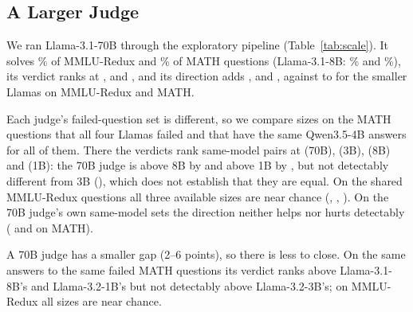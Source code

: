\documentclass[11pt]{article}
\newcounter{takeaway}
\begin{document}
\subsection{A Larger Judge}
\label{sec:scale}

\begin{table}[t]
\centering
\small

\caption{Llama judges by size, main answer pools (exploratory protocol). Solves: share of the pool's questions the judge answers correctly (\%). Verdict: the verdict's ranking. Gap: best layer's direction ranking minus the verdict's. Same model: the verdict's ranking on same-model pairs (Qwen3.5-4B answers) on questions the judge failed; Llama-3.2-3B has no MMLU-Redux same-model run.}
\label{tab:scale}
\end{table}

We ran Llama-3.1-70B through the exploratory pipeline (Table~\ref{tab:scale}). It solves \% of MMLU-Redux and \% of MATH questions (Llama-3.1-8B: \% and \%), its verdict ranks at ,  and , and its direction adds ,  and , against  to  for the smaller Llamas on MMLU-Redux and MATH.

Each judge's failed-question set is different, so we compare sizes on the  MATH questions that all four Llamas failed and that have the same Qwen3.5-4B answers for all of them. There the verdicts rank same-model pairs at  (70B),  (3B),  (8B) and  (1B): the 70B judge is above 8B by  and above 1B by , but not detectably different from 3B (), which does not establish that they are equal. On the  shared MMLU-Redux questions all three available sizes are near chance (, , ). On the 70B judge's own same-model sets the direction neither helps nor hurts detectably ( and  on MATH).

\begin{takeaway}
A 70B judge has a smaller gap (2--6 points), so there is less to close. On the same answers to the same failed MATH questions its verdict ranks above Llama-3.1-8B's and Llama-3.2-1B's but not detectably above Llama-3.2-3B's; on MMLU-Redux all sizes are near chance.
\end{takeaway}
\end{document}
